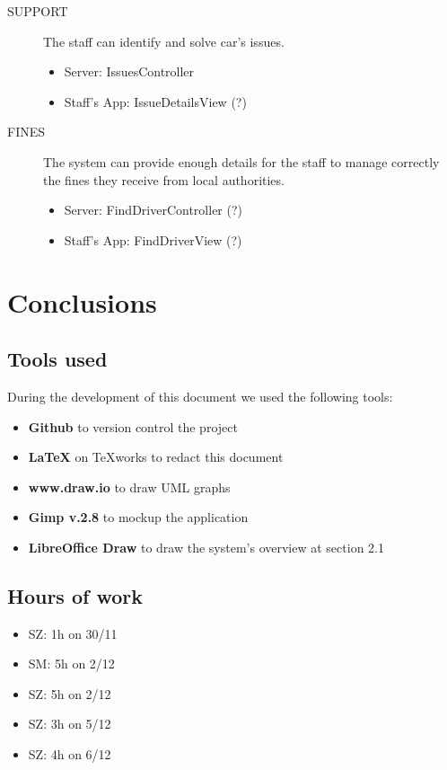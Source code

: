 \documentclass[11pt]{article} %
\begin{document}
\begin{description}
	\item[SUPPORT] The staff can identify and solve car's issues.
	\begin{itemize}
		\item Server: IssuesController
		\item Staff's App: IssueDetailsView (?)
	\end{itemize}

	\item[FINES] The system can provide enough details for the staff to manage correctly the fines they receive from local authorities.
	\begin{itemize}
		\item Server: FindDriverController (?)
		\item Staff's App: FindDriverView (?)
	\end{itemize}

 \end{description}


\newpage
\section{Conclusions}

\subsection{Tools used}
During the development of this document we used the following tools:
\begin{itemize}
	\item \textbf{Github} to version control the project
	\item \textbf{\LaTeX} on TeXworks to redact this document
	\item \textbf{www.draw.io} to draw UML graphs
	\item \textbf{Gimp v.2.8} to mockup the application
	\item \textbf{LibreOffice Draw} to draw the system's overview at section 2.1
\end{itemize}

\subsection{Hours of work}
\begin{itemize}
	\item SZ: 1h on 30/11
	\item SM: 5h on 2/12
	\item SZ: 5h on 2/12
	\item SZ: 3h on 5/12
	\item SZ: 4h on 6/12
\end{itemize}
\end{document}
